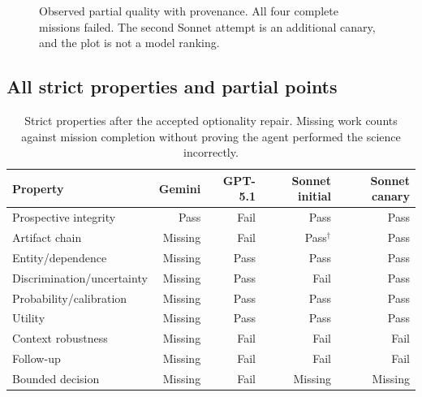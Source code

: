 \documentclass[11pt,a4paper]{article}
\begin{document}
\begin{figure}[H]\centering
{}
\caption{Observed partial quality with provenance. All four complete missions failed. The second Sonnet attempt is an additional canary, and the plot is not a model ranking.}
\end{figure}

\subsection{All strict properties and partial points}

\begin{table}[H]\small
\caption{Strict properties after the accepted optionality repair. Missing work counts against mission completion without proving the agent performed the science incorrectly.}
\begin{tabularx}{\textwidth}{@{}Yrrrr@{}}\toprule
Property & Gemini & GPT-5.1 & Sonnet initial & Sonnet canary \\\midrule
Prospective integrity & Pass & Fail & Pass & Pass \\
Artifact chain & Missing & Fail & Pass$^\dagger$ & Pass \\
Entity/dependence & Missing & Pass & Pass & Pass \\
Discrimination/uncertainty & Missing & Pass & Fail & Pass \\
Probability/calibration & Missing & Pass & Pass & Pass \\
Utility & Missing & Pass & Pass & Pass \\
Context robustness & Missing & Fail & Fail & Fail \\
Follow-up & Missing & Fail & Fail & Fail \\
Bounded decision & Missing & Fail & Missing & Missing \\\bottomrule
\end{tabularx}
\end{table}
\end{document}
